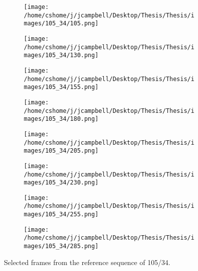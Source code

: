 \begin{figure}
\centering
\begin{subfigure}{0.24\textwidth}
\texttt{[image: /home/cshome/j/jcampbell/Desktop/Thesis/Thesis/images/105\_34/105.png]}
\end{subfigure}
\begin{subfigure}{0.24\textwidth}
\texttt{[image: /home/cshome/j/jcampbell/Desktop/Thesis/Thesis/images/105\_34/130.png]}
\end{subfigure}
\begin{subfigure}{0.24\textwidth}
\texttt{[image: /home/cshome/j/jcampbell/Desktop/Thesis/Thesis/images/105\_34/155.png]}
\end{subfigure}
\begin{subfigure}{0.24\textwidth}
\texttt{[image: /home/cshome/j/jcampbell/Desktop/Thesis/Thesis/images/105\_34/180.png]}
\end{subfigure}

\begin{subfigure}{0.24\textwidth}
\texttt{[image: /home/cshome/j/jcampbell/Desktop/Thesis/Thesis/images/105\_34/205.png]}
\end{subfigure}
\begin{subfigure}{0.24\textwidth}
\texttt{[image: /home/cshome/j/jcampbell/Desktop/Thesis/Thesis/images/105\_34/230.png]}
\end{subfigure}
\begin{subfigure}{0.24\textwidth}
\texttt{[image: /home/cshome/j/jcampbell/Desktop/Thesis/Thesis/images/105\_34/255.png]}
\end{subfigure}
\begin{subfigure}{0.24\textwidth}
\texttt{[image: /home/cshome/j/jcampbell/Desktop/Thesis/Thesis/images/105\_34/285.png]}
\end{subfigure}
\caption{ Selected frames from the reference sequence of 105/34.   \label{105_34}}
\end{figure}

